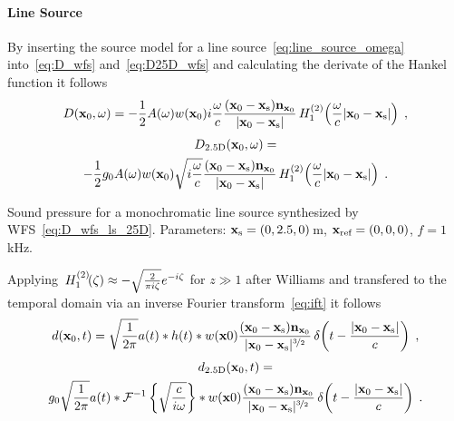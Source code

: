 \paragraph{Line Source}
%
%
By inserting the source model for a line source~\eqref{eq:line_source_omega}
into~\eqref{eq:D_wfs} and~\eqref{eq:D25D_wfs} and calculating the derivate of
the Hankel function\autocite[][(9.1.30)]{Abramowitz1972} it follows
%
\begin{equation}
    D(\x_0,\omega) = -\frac{1}{2}A(\omega) w(\x_0) i\omegac
    \frac{(\x_0-\xs)\n_{\x_0}}{|\x_0-\xs|}
    \H{1}{2}\left(\omegac|\x_0-\xs|\right) \qc
    \label{eq:D_wfs_ls}
\end{equation}
%
\begin{multline}
    D_\twohalfD(\x_0,\omega) = \\
    -\frac{1}{2}g_0 A(\omega) w(\x_0) \sqrt{i\omegac}
    \frac{(\x_0-\xs)\n_{\x_0}}{|\x_0-\xs|}
    \H{1}{2}\left(\omegac|\x_0-\xs|\right) \qp
    \label{eq:D_wfs_ls_25D}
\end{multline}
%
\begin{marginfigure}
    \centering
    \ft
    
    \caption{Sound pressure for a monochromatic line source synthesized by
        \twohalfD \ac{WFS}~\eqref{eq:D_wfs_ls_25D}. Parameters: $\mathbf{x}_\text{s} = (0,2.5,0)$\,m,
        $\mathbf{x}_\text{ref} = (0,0,0)$, $f = 1$\,kHz.
        }
\end{marginfigure}
%
Applying $\,H_{1}^{(2)}\!(\zeta) \approx -\sqrt{\frac{2}{\pi i\zeta}} e^{-i\zeta}$ for $z\gg1$ after
Williams and transfered to the
temporal domain via an inverse Fourier
transform~\eqref{eq:ift} it follows
%
\begin{equation}
    d(\x_0,t) = \sqrt{\frac{1}{2\pi}} a(t) * h(t) *
    w(\x0) \frac{(\x_0-\xs)\n_{\x_0}}{|\x_0-\xs|^{\nicefrac{3}{2}}}
    \deltafunc{t-\frac{|\x_0-\xs|}{c}} \qc
    \label{eq:d_wfs_ls}
\end{equation}
%
\begin{multline}
    d_\twohalfD(\x_0,t) = \\
    g_0 \sqrt{\frac{1}{2\pi}} a(t) *
    \IFT{\sqrt{\frac{c}{i\omega}}} * w(\x0)
    \frac{(\x_0-\xs)\n_{\x_0}}{|\x_0-\xs|^{\nicefrac{3}{2}}}
    \deltafunc{t-\frac{|\x_0-\xs|}{c}} \qp
    \label{eq:d_wfs_ls_25D}
\end{multline}
